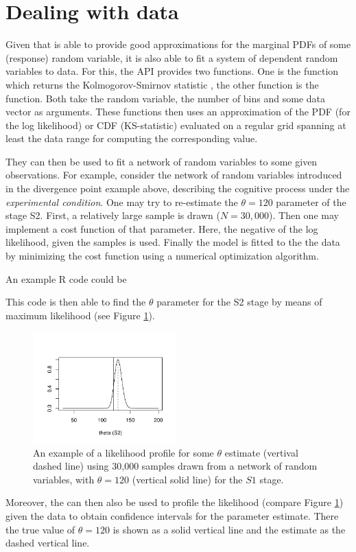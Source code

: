\section{Dealing with data}
Given that  is able to provide good approximations for the marginal PDFs of some
(response) random variable, it is also able to fit a system of dependent random variables to data.
For this, the  API provides two functions. One is the  function
which returns the Kolmogorov-Smirnov statistic \cite[KS-statistic, e.g.,][]{Kolmogorov1933,
Smirnov1948, Marsaglia2003}, the other function is the  function. Both take
the random variable, the number of bins and some data vector as arguments. These functions then
uses an approximation of the PDF (for the log likelihood) or CDF (KS-statistic) evaluated on a
regular grid spanning at least the data range for computing the corresponding value.

They can then be used to fit a network of random variables to some given observations. For
example, consider the network of random variables introduced in the divergence point example 
above, describing the cognitive
process under the \emph{experimental condition}. One may try to re-estimate the $\theta=120$
parameter of the stage S2. First, a relatively large sample is drawn ($N=30,000$). Then one may
implement a cost function of that parameter. Here, the negative of the log likelihood, given the
samples is used. Finally the model is fitted to the the data by minimizing the cost function using
a numerical optimization algorithm.

An example R code could be


This code is then able to find the $\theta$ parameter for the S2 stage by means of maximum likelihood (see Figure
\ref{fig:llprof}). 

\begin{figure}[!ht]
 \centering
 \includegraphics[width=0.49\textwidth]{fig/pod_likelihoodProf.pdf}
 \caption{An example of a likelihood profile for some $\theta$ estimate (vertival dashed line)
 using 30,000 samples drawn from a network of random variables, with $\theta=120$ (vertical
 solid line) for the $S1$ stage.} \label{fig:llprof}
\end{figure}

Moreover, the  can then also be used to profile the likelihood (compare Figure
\ref{fig:llprof}) given the data to obtain confidence intervals for the parameter estimate. There
the true value of $\theta=120$ is shown as a solid vertical line and the estimate as the dashed
vertical line. 
